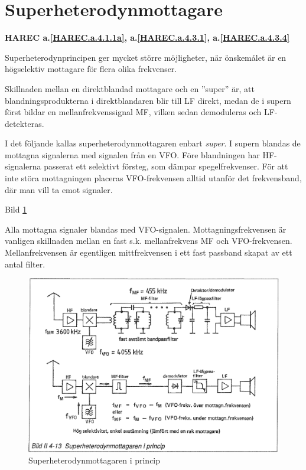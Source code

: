 \section{Superheterodynmottagare}
\textbf{
HAREC a.\ref{HAREC.a.4.1.1a}\label{myHAREC.a.4.1.1a},
 a.\ref{HAREC.a.4.3.1}\label{myHAREC.a.4.3.1},
 a.\ref{HAREC.a.4.3.4}\label{myHAREC.a.4.3.4}
}

Superheterodynprincipen ger mycket större möjligheter, när önskemålet
är en högselektiv mottagare för flera olika frekvenser.

Skillnaden mellan en direktblandad mottagare och en ''super'' är, att
blandningsprodukterna i direktblandaren blir till LF direkt, medan de
i supern först bildar en mellanfrekvenssignal MF, vilken sedan
demoduleras och LF-detekteras.

I det följande kallas superheterodynmottagaren enbart \emph{super}. I
supern blandas de mottagna signalerna med signalen från en VFO. Före
blandningen har HF-signalerna passerat ett selektivt försteg, som
dämpar spegelfrekvenser. För att inte störa mottagningen placeras
VFO-frekvensen alltid utanför det frekvensband, där man vill ta emot
signaler.

Bild \ref{fig:bildII4-13}

Alla mottagna signaler blandas med VFO-signalen. Mottagningsfrekvensen
är vanligen skillnaden mellan en fast s.k. mellanfrekvens MF och
VFO-frekvensen. Mellanfrekvensen är egentligen mittfrekvensen i ett
fast passband skapat av ett antal filter.

\begin{figure}
  \includegraphics[width=\textwidth]{images/bild_2_4-13}
  \caption{Superheterodynmottagaren i princip}
  \label{fig:bildII4-13}
\end{figure}

